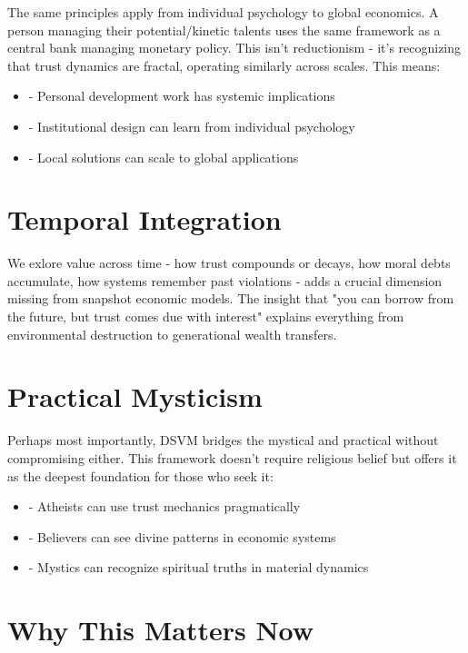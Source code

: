 \documentclass[11pt,oneside]{book}
\begin{document}
The same principles apply from individual psychology to global economics. A person managing their potential/kinetic talents uses the same framework as a central bank managing monetary policy. This isn't reductionism - it's recognizing that trust dynamics are fractal, operating similarly across scales. This means:

\begin{itemize}
\item - Personal development work has systemic implications
\item - Institutional design can learn from individual psychology
\item - Local solutions can scale to global applications
\end{itemize}

\section{Temporal Integration}

We exlore value across time - how trust compounds or decays, how moral debts accumulate, how systems remember past violations - adds a crucial dimension missing from snapshot economic models. The insight that "you can borrow from the future, but trust comes due with interest" explains everything from environmental destruction to generational wealth transfers.

\section{Practical Mysticism}

Perhaps most importantly, DSVM bridges the mystical and practical without compromising either. This framework doesn't require religious belief but offers it as the deepest foundation for those who seek it:

\begin{itemize}
\item - Atheists can use trust mechanics pragmatically
\item - Believers can see divine patterns in economic systems
\item - Mystics can recognize spiritual truths in material dynamics
\end{itemize}

\section{Why This Matters Now}
\end{document}

